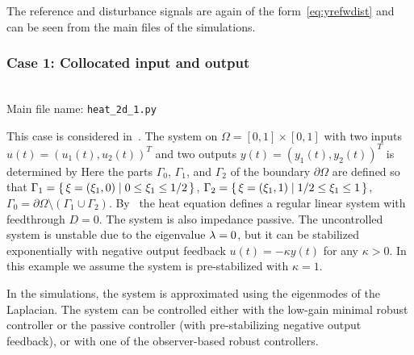 \documentclass[11pt, a4paper]{amsart}
\theoremstyle{definition}
\numberwithin{equation}{section}
\begin{document}
The reference and disturbance signals are again of the form~\eqref{eq:yrefwdist} and can be seen from the main files of the simulations.

\medskip

\subsubsection*{Case 1: Collocated input and output}
~\\[-1ex]


  \noindent Main file name: \texttt{heat\_2d\_1.py}

\medskip

This case is considered in~.
The system on $\Omega = [0,1]\times [0,1]$ with two inputs $u(t)=(u_1(t),u_2(t))^T$ and two outputs $y(t)=(y_1(t),y_2(t))^T$ is determined by
  Here the parts $\Gamma_0$, $\Gamma_1$, and $\Gamma_2$ of the boundary $\partial \Omega$ are defined so that
  $\Gamma_1 = \{\,\xi=(\xi_1,0)\mid0\leq \xi_1\leq 1/2\,\}$,
  $\Gamma_2 = \{\,\xi=(\xi_1,1)\mid1/2\leq \xi_1\leq 1\,\}$, 
  $\Gamma_0 = \partial \Omega \setminus (\Gamma_1 \cup \Gamma_2)$. By~\cite[Cor. 2]{ByrGil02} the heat equation defines a regular linear system with feedthrough $D=0$. The system is also impedance passive.
The uncontrolled system is unstable due to the eigenvalue $\lambda=0$, but it can be stabilized exponentially with negative output feedback $u(t) = -\kappa y(t)$ for any $\kappa>0$.
In this example we assume the system is pre-stabilized with $\kappa = 1$.

In the simulations, the system is approximated using the eigenmodes of the Laplacian. The system can be controlled either with the low-gain minimal robust controller or the passive controller (with pre-stabilizing negative output feedback), or with one of the observer-based robust controllers.
\end{document}
